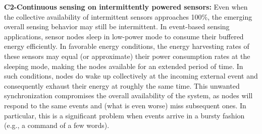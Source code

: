 


\noindent\textbf{C2-Continuous sensing on intermittently powered sensors:}  
Even when the collective availability of intermittent sensors approaches 100\%, the emerging overall sensing behavior may still be intermittent. 
In event-based sensing applications, sensor nodes sleep in low-power mode to consume their buffered energy efficiently. In favorable energy conditions, the energy harvesting rates of these sensors may equal (or approximate) their power consumption rates at the sleeping mode, making the nodes available for an extended period of time. 
In such conditions, nodes do wake up collectively at the incoming external event and consequently exhaust their energy at roughly the same time. 
%
This unwanted synchronization compromises the overall availability of the system, as nodes will respond to the same events and (what is even worse) miss subsequent ones. In particular, this is a significant problem when events arrive in a bursty fashion (e.g., a command of a few words).



